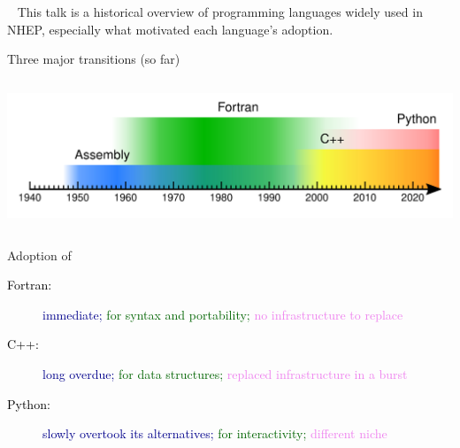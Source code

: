 \documentclass[aspectratio=169]{beamer}
\begin{document}
\begin{frame}{\mbox{ }}
\large
\vspace{0.5 cm}
This talk is a historical overview of programming languages widely used in NHEP, especially what motivated each language's adoption.

\vspace{1 cm}

\vspace{1 cm}

\vspace{0.2 cm}
\end{frame}

\begin{frame}{Three major transitions (so far)}
\begin{columns}
\includegraphics[width=\linewidth]{PLOTS/programming-languages.pdf}
\end{columns}

\large
\vspace{0.5 cm}
Adoption of

\begin{description}
\item[\textcolor{black}{Fortran:}] \textcolor{darkblue}{immediate;} \textcolor{darkgreen}{for syntax and portability;} \textcolor{violet}{no infrastructure to replace}
\item[\textcolor{black}{C++:}] \textcolor{darkblue}{long overdue;} \textcolor{darkgreen}{for data structures;} \textcolor{violet}{replaced infrastructure in a burst}
\item[\textcolor{black}{Python:}] \textcolor{darkblue}{slowly overtook its alternatives;} \textcolor{darkgreen}{for interactivity;} \textcolor{violet}{different niche}
\end{description}
\end{frame}
\end{document}
